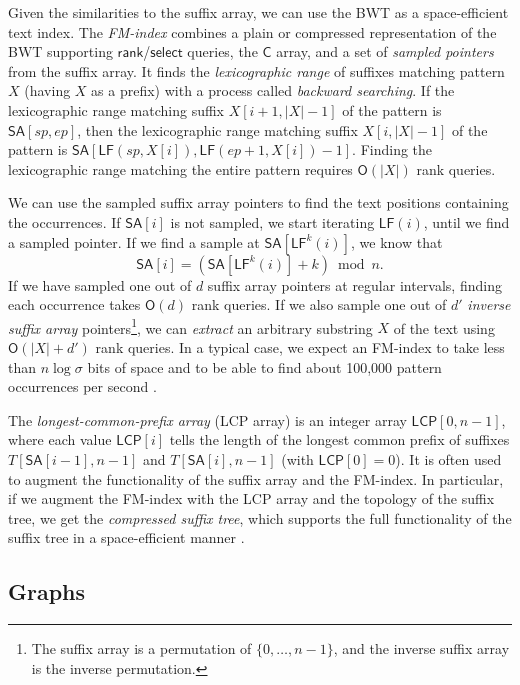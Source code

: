 \documentclass[a4paper,UKenglish]{lipics-v2016}
\newcommand{\set}[1]{\ensuremath{\{ #1 \}}}
\newcommand{\abs}[1]{\ensuremath{\lvert #1 \rvert}}
\newcommand{\Oh}[1]{\ensuremath{\mathsf{O}\!\left( #1 \right)}}
\newcommand{\rank}{\ensuremath{\mathsf{rank}}}
\newcommand{\select}{\ensuremath{\mathsf{select}}}
\newcommand{\LF}{\ensuremath{\mathsf{LF}}}
\newcommand{\FMindex}{FM\nobreakdash-index}
\newcommand{\SA}{\ensuremath{\mathsf{SA}}}
\newcommand{\Carray}{\ensuremath{\mathsf{C}}}
\newcommand{\LCP}{\ensuremath{\mathsf{LCP}}}
\begin{document}
Given the similarities to the suffix array, we can use the BWT as a space-efficient text index. The \emph{\FMindex} \cite{Ferragina2005a} combines a plain or compressed representation of the BWT supporting $\rank$/$\select$ queries, the $\Carray$ array, and a set of \emph{sampled pointers} from the suffix array. It finds the \emph{lexicographic range} of suffixes matching pattern $X$ (having $X$ as a prefix) with a process called \emph{backward searching}. If the lexicographic range matching suffix $X[i+1, \abs{X}-1]$ of the pattern is $\SA[sp, ep]$, then the lexicographic range matching suffix $X[i, \abs{X}-1]$ of the pattern is $\SA[\LF(sp, X[i]), \LF(ep+1, X[i]) - 1]$. Finding the lexicographic range matching the entire pattern requires $\Oh{\abs{X}}$ rank queries.

We can use the sampled suffix array pointers to find the text positions containing the occurrences. If $\SA[i]$ is not sampled, we start iterating $\LF(i)$, until we find a sampled pointer. If we find a sample at $\SA[\LF^{k}(i)]$, we know that
$$
\SA[i] = (\SA[\LF^{k}(i)] + k) \bmod n.
$$
If we have sampled one out of $d$ suffix array pointers at regular intervals, finding each occurrence takes $\Oh{d}$ rank queries. If we also sample one out of $d'$ \emph{inverse suffix array} pointers\footnote{The suffix array is a permutation of $\set{0, \dotsc, n-1}$, and the inverse suffix array is the inverse permutation.}, we can \emph{extract} an arbitrary substring $X$ of the text using $\Oh{\abs{X}+d'}$ rank queries. In a typical case, we expect an \FMindex{} to take less than $n \log \sigma$ bits of space and to be able to find about 100,000 pattern occurrences per second \cite{Ferragina2009a}.

The \emph{longest-common-prefix array} (LCP array) \cite{Manber1993} is an integer array $\LCP[0, n-1]$, where each value $\LCP[i]$ tells the length of the longest common prefix of suffixes $T[\SA[i-1], n-1]$ and $T[\SA[i], n-1]$ (with $\LCP[0] = 0$). It is often used to augment the functionality of the suffix array and the \FMindex. In particular, if we augment the \FMindex{} with the LCP array and the topology of the suffix tree, we get the \emph{compressed suffix tree}, which supports the full functionality of the suffix tree in a space-efficient manner \cite{Sadakane2007}.

\subsection{Graphs}\label{sect:graphs}
\end{document}
